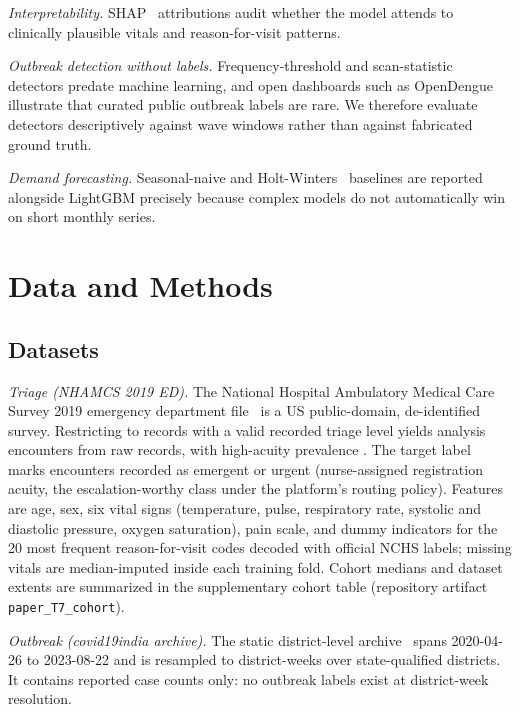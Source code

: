 \documentclass[conference]{IEEEtran}
\begin{document}
\emph{Interpretability.} SHAP~\cite{lundberg2017shap} attributions audit
whether the model attends to clinically plausible vitals and reason-for-visit
patterns.

\emph{Outbreak detection without labels.} Frequency-threshold and
scan-statistic detectors predate machine learning, and open dashboards such as
OpenDengue~\cite{clarke2024opendengue} illustrate that curated public
outbreak labels are rare. We therefore evaluate detectors descriptively
against wave windows rather than against fabricated ground truth.

\emph{Demand forecasting.} Seasonal-naive and
Holt-Winters~\cite{seabold2010statsmodels} baselines are reported alongside
LightGBM precisely because complex models do not automatically win on short
monthly series.

\section{Data and Methods}
\label{sec:methods}

\subsection{Datasets}
\label{sec:datasets}

\emph{Triage (NHAMCS 2019 ED).} The National Hospital Ambulatory Medical Care
Survey 2019 emergency department file~\cite{nhamcs2019} is a US
public-domain, de-identified survey. Restricting to records with a valid
recorded triage level yields \Nanalysis{} analysis encounters from \Nraw{}
raw records, with high-acuity prevalence \Prev. The target label marks
encounters recorded as emergent or urgent (nurse-assigned registration
acuity, the escalation-worthy class under the platform's routing
policy). Features are age, sex, six vital signs
(temperature, pulse, respiratory rate, systolic and diastolic pressure, oxygen
saturation), pain scale, and dummy indicators for the 20 most frequent
reason-for-visit codes decoded with official NCHS labels; missing vitals are
median-imputed inside each training fold. Cohort medians and dataset extents
are summarized in the supplementary cohort table (repository artifact
\texttt{paper\_T7\_cohort}).

\emph{Outbreak (covid19india archive).} The static district-level
archive~\cite{covid19india2023} spans 2020-04-26 to 2023-08-22 and is
resampled to \DWeeks{} district-weeks over \NDistricts{} state-qualified
districts. It contains reported case counts only: no outbreak labels exist at
district-week resolution.
\end{document}
